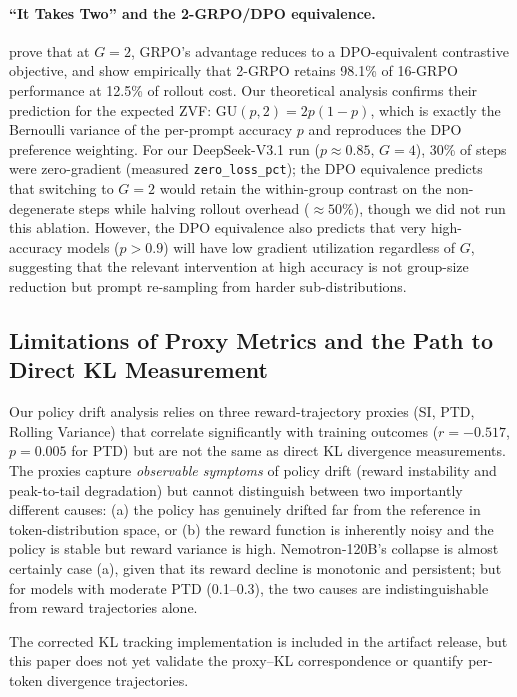 \documentclass{article}
\begin{document}
\paragraph{``It Takes Two'' and the 2-GRPO/DPO equivalence.}
\citet{wu2025grpo_dpo} prove that at $G = 2$, GRPO's advantage reduces to a
DPO-equivalent contrastive objective, and show empirically that 2-GRPO retains
98.1\% of 16-GRPO performance at 12.5\% of rollout cost.
Our theoretical analysis confirms their prediction for the expected ZVF:
$\mathrm{GU}(p, 2) = 2p(1-p)$, which is exactly the Bernoulli variance of
the per-prompt accuracy $p$ and reproduces the DPO preference weighting.
For our DeepSeek-V3.1 run ($p \approx 0.85$, $G = 4$), 30\% of steps were
zero-gradient (measured \texttt{zero\_loss\_pct}); the DPO equivalence predicts
that switching to $G = 2$ would retain the within-group contrast on the
non-degenerate steps while halving rollout overhead ($\approx 50\%$), though we
did not run this ablation.
However, the DPO equivalence also predicts that very high-accuracy models
($p > 0.9$) will have low gradient utilization regardless of $G$, suggesting
that the relevant intervention at high accuracy is not group-size reduction
but prompt re-sampling from harder sub-distributions.

\subsection{Limitations of Proxy Metrics and the Path to Direct KL Measurement}
\label{sec:discuss_kl}

Our policy drift analysis relies on three reward-trajectory proxies (SI, PTD,
Rolling Variance) that correlate significantly with training outcomes
($r = -0.517$, $p = 0.005$ for PTD) but are not the same as direct KL
divergence measurements.
The proxies capture \emph{observable symptoms} of policy drift (reward
instability and peak-to-tail degradation) but cannot distinguish between
two importantly different causes: (a) the policy has genuinely drifted far from
the reference in token-distribution space, or (b) the reward function is
inherently noisy and the policy is stable but reward variance is high.
Nemotron-120B's collapse is almost certainly case (a), given that its reward
decline is monotonic and persistent; but for models with moderate PTD (0.1--0.3),
the two causes are indistinguishable from reward trajectories alone.

The corrected KL tracking implementation is included in the artifact release,
but this paper does not yet validate the proxy--KL correspondence or quantify
per-token divergence trajectories.
\end{document}
